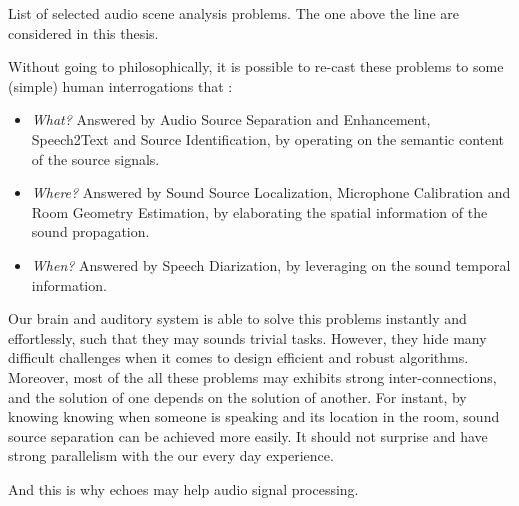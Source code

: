 \begin{table}[!h]

    \begin{fullwidth}
    \centering
    \small

    
    \caption{List of selected audio scene analysis problems. The one above the line are considered in this thesis.}
    \label{tab:processing:problems}

    \end{fullwidth}

\end{table}

\mynewline
Without going to philosophically, it is possible to re-cast these problems to some (simple) human interrogations that :
\begin{itemize}
    \item  \textit{What?} Answered by Audio Source Separation and Enhancement, Speech2Text and Source Identification, by operating on the semantic content of the source signals.
    \item  \textit{Where?} Answered by Sound Source Localization, Microphone Calibration and Room Geometry Estimation, by elaborating the spatial information of the sound propagation.
    \item  \textit{When?} Answered by Speech Diarization, by leveraging on the sound temporal information.
\end{itemize}

\mynewline{}
Our brain and auditory system is able to solve this problems instantly and effortlessly, such that they may sounds trivial tasks.
However, they hide many difficult challenges when it comes to design efficient and robust algorithms.
Moreover, most of the all these problems may exhibits strong inter-connections, and the solution of one depends on the solution of another.
For instant, by knowing knowing when someone is speaking and its location in the room, sound source separation can be achieved more easily.
It should not surprise and have strong parallelism with the our every day experience.

\mynewline
And this is why echoes may help audio signal processing.


